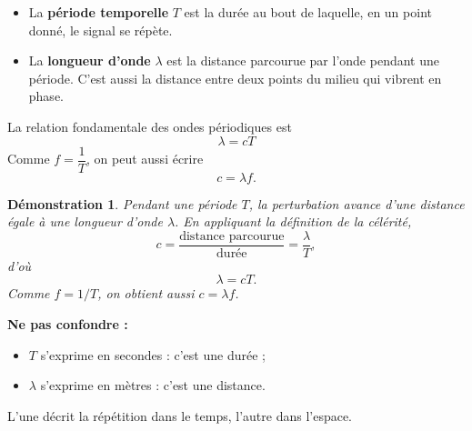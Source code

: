 \documentclass[11pt,a4paper]{article}
\newtheorem*{demonstration}{Démonstration}
\begin{document}
\begin{definitionbox}
\begin{itemize}
    \item La \textbf{période temporelle} $T$ est la durée au bout de laquelle, en un point donné, le signal se répète.
    \item La \textbf{longueur d'onde} $\lambda$ est la distance parcourue par l'onde pendant une période. C'est aussi la distance entre deux points du milieu qui vibrent en phase.
\end{itemize}
\end{definitionbox}

\begin{center}
\end{center}

\begin{propriete}
La relation fondamentale des ondes périodiques est
\[
\lambda = cT
\]
Comme $f=\dfrac{1}{T}$, on peut aussi écrire
\[
c = \lambda f.
\]
\end{propriete}

\begin{demonstration}
Pendant une période $T$, la perturbation avance d'une distance égale à une longueur d'onde $\lambda$. En appliquant la définition de la célérité,
\[
c=\frac{\text{distance parcourue}}{\text{durée}}=\frac{\lambda}{T},
\]
d'où
\[
\lambda=cT.
\]
Comme $f=1/T$, on obtient aussi $c=\lambda f$.
\end{demonstration}

\begin{attentionbox}
\textbf{Ne pas confondre :}
\begin{itemize}
    \item $T$ s'exprime en secondes : c'est une durée ;
    \item $\lambda$ s'exprime en mètres : c'est une distance.
\end{itemize}
L'une décrit la répétition dans le temps, l'autre dans l'espace.
\end{attentionbox}
\end{document}

